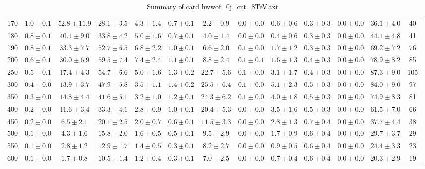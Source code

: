 \begin{table}
{\begin{center}
\begin{tabular}{l | c c | c c c c c c c c  | c c}
170 & $1.0\pm0.1$ & $52.8\pm11.9$ & $28.1\pm3.5$ & $4.3\pm1.4$ & $0.7\pm0.1$ & $2.2\pm0.9$ & $0.0\pm0.0$ & $0.6\pm0.6$ & $0.3\pm0.3$ & $0.0\pm0.0$ & $36.1\pm4.0$ & 40 \\
180 & $0.8\pm0.1$ & $40.1\pm9.0$ & $33.8\pm4.2$ & $5.0\pm1.6$ & $0.7\pm0.1$ & $4.0\pm1.4$ & $0.0\pm0.0$ & $0.4\pm0.6$ & $0.3\pm0.3$ & $0.0\pm0.0$ & $44.1\pm4.8$ & 41 \\
190 & $0.8\pm0.1$ & $33.3\pm7.7$ & $52.7\pm6.5$ & $6.8\pm2.2$ & $1.0\pm0.1$ & $6.6\pm2.0$ & $0.1\pm0.0$ & $1.7\pm1.2$ & $0.3\pm0.3$ & $0.0\pm0.0$ & $69.2\pm7.2$ & 76 \\
200 & $0.6\pm0.1$ & $30.0\pm6.9$ & $59.5\pm7.4$ & $7.4\pm2.4$ & $1.1\pm0.1$ & $8.8\pm2.4$ & $0.1\pm0.1$ & $1.6\pm1.3$ & $0.4\pm0.3$ & $0.0\pm0.0$ & $78.9\pm8.2$ & 85 \\
250 & $0.5\pm0.1$ & $17.4\pm4.3$ & $54.7\pm6.6$ & $5.0\pm1.6$ & $1.3\pm0.2$ & $22.7\pm5.6$ & $0.1\pm0.0$ & $3.1\pm1.7$ & $0.4\pm0.3$ & $0.0\pm0.0$ & $87.3\pm9.0$ & 105 \\
300 & $0.4\pm0.0$ & $13.9\pm3.7$ & $47.9\pm5.8$ & $3.5\pm1.1$ & $1.4\pm0.2$ & $25.5\pm6.4$ & $0.1\pm0.0$ & $5.1\pm2.3$ & $0.5\pm0.3$ & $0.0\pm0.0$ & $84.0\pm9.0$ & 97 \\
350 & $0.3\pm0.0$ & $14.8\pm4.4$ & $41.6\pm5.1$ & $3.2\pm1.0$ & $1.2\pm0.1$ & $24.3\pm6.2$ & $0.1\pm0.0$ & $4.0\pm1.8$ & $0.5\pm0.3$ & $0.0\pm0.0$ & $74.9\pm8.3$ & 81 \\
400 & $0.2\pm0.0$ & $11.6\pm3.4$ & $33.3\pm4.1$ & $2.8\pm0.9$ & $1.0\pm0.1$ & $20.4\pm5.3$ & $0.0\pm0.0$ & $3.5\pm1.6$ & $0.5\pm0.3$ & $0.0\pm0.0$ & $61.5\pm7.0$ & 66 \\
450 & $0.2\pm0.0$ & $6.5\pm2.1$ & $20.1\pm2.5$ & $2.0\pm0.7$ & $0.6\pm0.1$ & $11.5\pm3.3$ & $0.0\pm0.0$ & $2.8\pm1.3$ & $0.7\pm0.4$ & $0.0\pm0.0$ & $37.7\pm4.4$ & 38 \\
500 & $0.1\pm0.0$ & $4.3\pm1.6$ & $15.8\pm2.0$ & $1.6\pm0.5$ & $0.5\pm0.1$ & $9.5\pm2.9$ & $0.0\pm0.0$ & $1.7\pm0.9$ & $0.6\pm0.4$ & $0.0\pm0.0$ & $29.7\pm3.7$ & 29 \\
550 & $0.1\pm0.0$ & $2.8\pm1.2$ & $12.9\pm1.7$ & $1.4\pm0.5$ & $0.3\pm0.1$ & $8.2\pm2.7$ & $0.0\pm0.0$ & $0.9\pm0.5$ & $0.6\pm0.4$ & $0.0\pm0.0$ & $24.4\pm3.3$ & 23 \\
600 & $0.1\pm0.0$ & $1.7\pm0.8$ & $10.5\pm1.4$ & $1.2\pm0.4$ & $0.3\pm0.1$ & $7.0\pm2.5$ & $0.0\pm0.0$ & $0.7\pm0.4$ & $0.6\pm0.4$ & $0.0\pm0.0$ & $20.3\pm2.9$ & 19 \\
\hline
\end{tabular}
\end{center}
}
\caption{Summary of card hwwof\_0j\_cut\_8TeV.txt}
\end{table}
